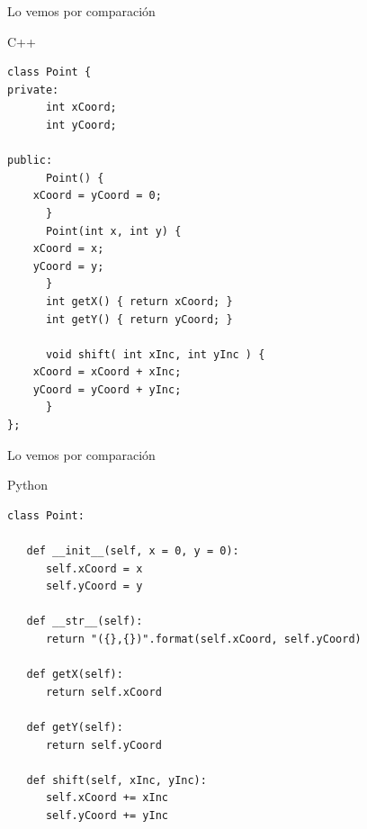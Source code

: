\documentclass[bigger,unknownkeysallowed]{beamer}
\begin{document}
\begin{frame}[fragile,label={sec:orge054e0e}]{Lo vemos por comparación}
 \begin{block}{C++}
\begin{verbatim}
class Point {
private:
      int xCoord;
      int yCoord;

public:
      Point() {
	xCoord = yCoord = 0;
      }
      Point(int x, int y) {
	xCoord = x;
	yCoord = y;
      }
      int getX() { return xCoord; }
      int getY() { return yCoord; }

      void shift( int xInc, int yInc ) {
	xCoord = xCoord + xInc;
	yCoord = yCoord + yInc;
      }
};
\end{verbatim}
\end{block}
\end{frame}


\begin{frame}[fragile,label={sec:orgb6ba49b}]{Lo vemos por comparación}
 \begin{block}{Python}
\begin{verbatim}
class Point:

   def __init__(self, x = 0, y = 0):
      self.xCoord = x
      self.yCoord = y

   def __str__(self):
      return "({},{})".format(self.xCoord, self.yCoord)

   def getX(self):
      return self.xCoord

   def getY(self):
      return self.yCoord

   def shift(self, xInc, yInc):
      self.xCoord += xInc
      self.yCoord += yInc
\end{verbatim}
\end{block}
\end{frame}
\end{document}
